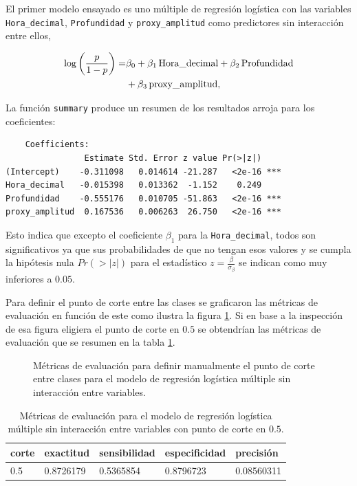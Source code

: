\documentclass[a4paper]{report}
\begin{document}
El primer modelo ensayado es uno múltiple de regresión logística con las variables \verb'Hora_decimal', \verb'Profundidad' y \verb'proxy_amplitud' como predictores sin interacción entre ellos,

\begin{align}
	\log \left( \frac{p}{1-p} \right) = &
	 \beta_0 + \beta_1\, \text{Hora\_decimal} + \beta_2 \, \text{Profundidad}\notag\\
	& + \beta_3 \, \text{proxy\_amplitud},
	\label{eq:regresion_logistica}
\end{align}

La función \verb'summary' produce un resumen de los resultados arroja para los coeficientes:
\begin{verbatim}
	Coefficients:
                Estimate Std. Error z value Pr(>|z|)    
(Intercept)    -0.311098   0.014614 -21.287   <2e-16 ***
Hora_decimal   -0.015398   0.013362  -1.152    0.249    
Profundidad    -0.555176   0.010705 -51.863   <2e-16 ***
proxy_amplitud  0.167536   0.006263  26.750   <2e-16 ***
\end{verbatim} 
Esto indica que excepto el coeficiente \(\beta_1\) para la \verb'Hora_decimal', todos son significativos ya que sus probabilidades de que no tengan esos valores y se cumpla la hipótesis nula \(Pr(>|z|)\) para el estadístico \(z = \frac{\beta}{\sigma_\beta}\) se indican como muy inferiores a \(0.05\).

Para definir el punto de corte entre las clases se graficaron las métricas de evaluación en función de este como ilustra la figura \ref{fig:múltiple_metrics}.
Si en base a la inspección de esa figura eligiera el punto de corte en \(0.5\) se obtendrían las métricas de evaluación que se resumen en la tabla \ref{tab:múltiple_metrics}.

\begin{figure}[!h]
	\centering
	
	\caption{Métricas de evaluación para definir manualmente el punto de corte entre clases para el modelo de regresión logística múltiple sin interacción entre variables.}
	\label{fig:múltiple_metrics}
\end{figure}

\begin{table}[h]
\centering
\begin{tabular}{lllll}
\toprule
corte & exactitud & sensibilidad & especificidad & precisión \\
\midrule
\num{0.5} & \num{0.8726179} & \num{0.5365854} & \num{0.8796723} & \num{0.08560311} \\
\bottomrule
\end{tabular}
\caption{Métricas de evaluación para el modelo de regresión logística múltiple sin interacción entre variables con punto de corte en \(0.5\).}
\label{tab:múltiple_metrics}
\end{table}
\end{document}
